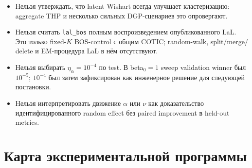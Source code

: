 \documentclass[11pt,a4paper]{article}
\newcommand{\code}[1]{\texttt{#1}}
\begin{document}
\begin{itemize}
  \item Нельзя утверждать, что latent Wishart всегда улучшает кластеризацию:
  aggregate THP и несколько сильных DGP-сценариев это опровергают.
  \item Нельзя считать \code{lal\_bos} полным воспроизведением опубликованного
  LaL. Это только fixed-$K$ BOS-control с общим COTIC; random-walk, split/merge/
  delete и EM-процедура LaL в нём отсутствуют.
  \item Нельзя выбирать $\eta_{\alpha}=10^{-4}$ по test. В beta$_0=1$ sweep
  validation winner был $10^{-5}$; $10^{-4}$ был затем зафиксирован как
  инженерное решение для следующей постановки.
  \item Нельзя интерпретировать движение $\alpha$ или $\nu$ как доказательство
  идентифицированного random effect без paired improvement в held-out metrics.
\end{itemize}

\section{Карта экспериментальной программы}
\end{document}
